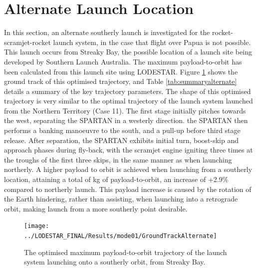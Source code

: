 \section{Alternate Launch Location}

In this section, an alternate southerly launch is investigated for the rocket-scramjet-rocket launch system, in the case that flight over Papua is not possible. This launch occurs from Streaky Bay, the possible location of a launch site being developed by Southern Launch Australia\cite{Council2016}. The maximum payload-to-orbit has been calculated from this launch site using LODESTAR. Figure \ref{fig:GroundTrackAlternate} shows the ground track of this optimised trajectory, and Table \ref{tab:summaryalternate} details a summary of the key trajectory parameters. The shape of this optimised trajectory is very similar to the optimal trajectory of the launch system launched from the Northern Territory (Case 11). The first stage initially pitches towards the west, separating the SPARTAN in a westerly direction. the SPARTAN then performs a banking manoeuvre to the south, and a pull-up before third stage release. After separation, the SPARTAN exhibits initial turn, boost-skip and approach phases during fly-back, with the scramjet engine igniting three times at the troughs of the first three skips, in the same manner as when launching northerly. A higher payload to orbit is achieved when launching from a southerly location, attaining a total of \PayloadToOrbitAlternate kg of payload-to-orbit, an increase of +2.9\% compared to northerly launch. This payload increase is caused by the rotation of the Earth hindering, rather than assisting, when launching into a retrograde orbit, making launch from a more southerly point desirable. 


\begin{figure}[th]
	\centering
	\texttt{[image: ../LODESTAR\_FINAL/Results/mode01/GroundTrackAlternate]}
	\caption{The optimised maximum payload-to-orbit trajectory of the launch system launching onto a southerly orbit, from Streaky Bay.}
	\label{fig:GroundTrackAlternate}
\end{figure}

